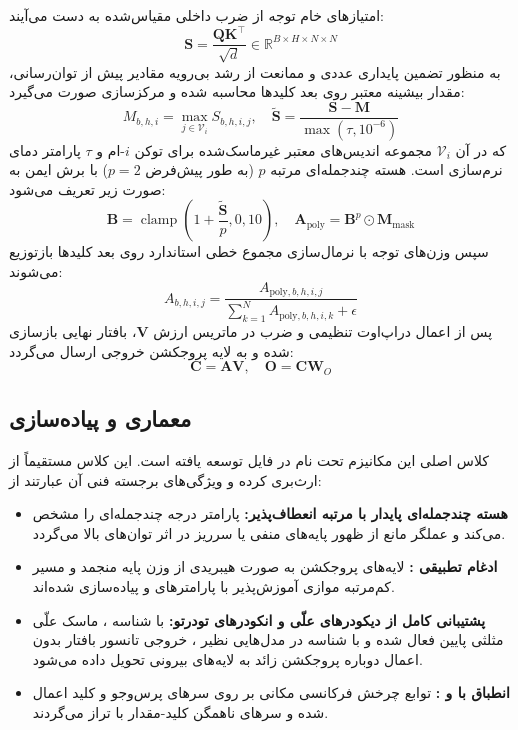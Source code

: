 امتیازهای خام توجه از ضرب داخلی مقیاس‌شده به دست می‌آیند:
\begin{equation}
\mathbf{S} = \frac{\mathbf{Q} \mathbf{K}^\top}{\sqrt{d}} \in \mathbb{R}^{B \times H \times N \times N}
\end{equation}
به منظور تضمین پایداری عددی و ممانعت از رشد بی‌رویه مقادیر پیش از توان‌رسانی، مقدار بیشینه معتبر روی بعد کلیدها محاسبه شده و مرکزسازی صورت می‌گیرد:
\begin{equation}
M_{b,h,i} = \max_{j \in \mathcal{V}_i} S_{b,h,i,j}, \quad \tilde{\mathbf{S}} = \frac{\mathbf{S} - \mathbf{M}}{\max(\tau, 10^{-6})}
\end{equation}
که در آن $\mathcal{V}_i$ مجموعه اندیس‌های معتبر غیرماسک‌شده برای توکن $i$-ام و $\tau$ پارامتر دمای نرم‌سازی است. هسته چندجمله‌ای مرتبه $p$ (به طور پیش‌فرض $p=2$) با برش ایمن به صورت زیر تعریف می‌شود:
\begin{equation}
\mathbf{B} = \operatorname{clamp}\left(1 + \frac{\tilde{\mathbf{S}}}{p}, 0, 10\right), \quad \mathbf{A}_{\text{poly}} = \mathbf{B}^p \odot \mathbf{M}_{\text{mask}}
\end{equation}
سپس وزن‌های توجه با نرمال‌سازی مجموع خطی استاندارد روی بعد کلیدها بازتوزیع می‌شوند:
\begin{equation}
A_{b,h,i,j} = \frac{A_{\text{poly},b,h,i,j}}{\sum_{k=1}^N A_{\text{poly},b,h,i,k} + \epsilon}
\end{equation}
پس از اعمال دراپ‌اوت تنظیمی و ضرب در ماتریس ارزش $\mathbf{V}$، بافتار نهایی بازسازی شده و به لایه پروجکشن خروجی ارسال می‌گردد:
\begin{equation}
\mathbf{C} = \mathbf{A} \mathbf{V}, \quad \mathbf{O} = \mathbf{C} \mathbf{W}_O
\end{equation}

\subsection{معماری و پیاده‌سازی}
کلاس اصلی این مکانیزم تحت نام  در فایل  توسعه یافته است. این کلاس مستقیماً از  ارث‌بری کرده و ویژگی‌های برجسته فنی آن عبارتند از:
\begin{itemize}
    \item \textbf{هسته چندجمله‌ای پایدار با مرتبه انعطاف‌پذیر:} پارامتر  درجه چندجمله‌ای را مشخص می‌کند و عملگر  مانع از ظهور پایه‌های منفی یا سرریز در اثر توان‌های بالا می‌گردد.
    \item \textbf{ادغام تطبیقی :} لایه‌های پروجکشن به صورت هیبریدی از وزن پایه منجمد و مسیر کم‌مرتبه موازی آموزش‌پذیر با پارامترهای  و  پیاده‌سازی شده‌اند.
    \item \textbf{پشتیبانی کامل از دیکودرهای علّی و انکودرهای تودرتو:} با شناسه ، ماسک علّی مثلثی پایین فعال شده و با شناسه  در مدل‌هایی نظیر ، خروجی تانسور بافتار بدون اعمال دوباره پروجکشن زائد به لایه‌های بیرونی تحویل داده می‌شود.
    \item \textbf{انطباق با  و :} توابع چرخش فرکانسی مکانی بر روی سرهای پرس‌وجو و کلید اعمال شده و سرهای ناهمگن کلید-مقدار با  تراز می‌گردند.
\end{itemize}

